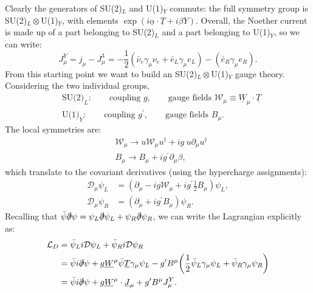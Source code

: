 \documentclass[a4paper,12pt]{article}
\begin{document}
Clearly the generators of SU(2)$_L$ and U(1)$_Y$ commute: the full symmetry group is SU(2)$_L \otimes$U(1)$_Y$, with elements $\exp{(i \underline{\alpha} \cdot \underline{T} + i \beta Y)}$. Overall, the Noether current is made up of a part belonging to SU(2)$_L$ and a part belonging to U(1)$_Y$, so we can write:
\begin{equation}
J_\mu^Y = j_\mu - J_\mu^3 = - \frac{1}{2}(\bar{\nu}_e \gamma_\mu \nu_e + \bar{e}_L \gamma_\mu e_L) - (\bar{e}_R \gamma_\mu e_R).
\end{equation}
From this starting point we want to build an SU(2)$_L \otimes$U(1)$_Y$ gauge theory. Considering the two individual groups,
\begin{equation}
\begin{split}
&\text{SU(2)}_L: \qquad \text{coupling \ } g, \qquad \text{gauge fields \ } \mathcal{W}_\mu \equiv \underline{W}_\mu \cdot \underline{T} \\
&\text{U(1)}_Y: \qquad \text{coupling \ } g^\prime, \qquad \text{gauge fields \ } B_\mu.
\end{split}
\end{equation}
The local symmetries are:
\begin{equation}
\begin{split}
&\mathcal{W}_\mu \to u \mathcal{W}_\mu u^\dagger + ig\ u \partial_\mu u^\dagger \\
&B_\mu \to B_\mu + i g^\prime \partial_\mu \beta,
\end{split}
\end{equation}
which translate to the covariant derivatives (using the hypercharge assignments):
\begin{equation}
\begin{split}
\mathcal{D}_\mu \psi_L &= (\partial_\mu - ig \mathcal{W}_\mu + i g^\prime \frac{1}{2} B_\mu) \psi_L, \\
\mathcal{D}_\mu \psi_R &= (\partial_\mu + i g^\prime B_\mu) \psi_R.
\end{split}
\end{equation}
Recalling that $\bar{\psi}\slashed{\partial}\psi = \psi_L \slashed{\partial} \psi_L + \psi_R \slashed{\partial} \psi_R$, we can write the Lagrangian explicitly as:
\begin{equation} 
\label{eqn:20a}
\begin{split}
\mathcal{L}_D &= \bar{\psi}_L i \mathcal{D} \psi_L +  \bar{\psi}_R i \mathcal{D} \psi_R \\
&= \bar{\psi} i \slashed{\partial} \psi + g \underline{W}^\mu \bar{\psi} \underline{T} \gamma_\mu \psi_L - g^\prime B^\mu \bigg( \frac{1}{2} \bar{\psi}_L \gamma_\mu \psi_L + \bar{\psi}_R \gamma_\mu \psi_R \bigg) \\
& = \bar{\psi} i \slashed{\partial} \psi + g \underline{W}^\mu \cdot \underline{J}_\mu + g^\prime B^\mu J_\mu^Y.
\end{split}
\end{equation}
\end{document}
